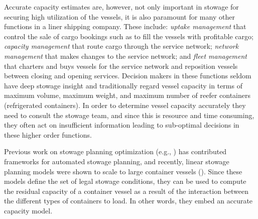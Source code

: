 Accurate capacity estimates are, however, not only important in stowage 
for securing high utilization of the vessels,
it is also paramount for many other functions in a liner shipping company. These include: {\em uptake management} that control the sale of cargo bookings such as to fill the vessels with profitable cargo; {\em capacity management} that route cargo through the service network; {\em network management} that makes changes to the service network; and {\em fleet management} that charters and buys vessels for the service network and reposition vessels between closing and opening services.  
Decision makers in these functions seldom have deep stowage insight and traditionally regard vessel capacity in terms of maximum volume, maximum weight, and maximum number of reefer containers (refrigerated containers). In order to determine vessel capacity accurately they need to consult the stowage team, and since this is resource and time consuming, they often act on insufficient information leading to sub-optimal decisions in these higher order functions.  

Previous work on stowage planning optimization (e.g., \cite{roach00,kimkang02,ambrosino04,low09,delgado09,pacino12}) has contributed frameworks for automated stowage planning, and recently, linear stowage planning models were shown to scale to large container vessels (\cite{pacino11,AlbertosThesis}). Since these models define the set of legal stowage conditions, they can be used to compute the residual capacity of a container vessel as a result of the interaction between the different types of containers to load. In other words, they embed an accurate capacity model. 

